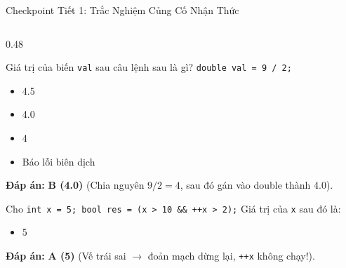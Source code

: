 \documentclass[aspectratio=169, 10pt]{beamer}
\begin{document}
\begin{frame}[fragile]{Checkpoint Tiết 1: Trắc Nghiệm Củng Cố Nhận Thức}
  \begin{columns}[T]
    \begin{column}{0.48\textwidth}
      \begin{tcolorbox}[colback=UniNavy!5,colframe=UniNavy,title=\textbf{Câu hỏi 1: Phép chia nguyên},fonttitle=\small\bfseries]
        Giá trị của biến \texttt{val} sau câu lệnh sau là gì?
        \texttt{double val = 9 / 2;}
        \begin{itemize}\footnotesize
          \item[A.] 4.5
          \item[B.] 4.0
          \item[C.] 4
          \item[D.] Báo lỗi biên dịch
        \end{itemize}
        \textbf{Đáp án:} \textcolor{UniGreen}{\textbf{B (4.0)}} (Chia nguyên $9/2=4$, sau đó gán vào double thành 4.0).
      \end{tcolorbox}

      \begin{tcolorbox}[colback=UniNavy!5,colframe=UniNavy,title=\textbf{Câu hỏi 2: Đoản mạch},fonttitle=\small\bfseries]
        Cho \texttt{int x = 5; bool res = (x > 10 \&\& ++x > 2);} Giá trị của \texttt{x} sau đó là:
        \begin{itemize}\footnotesize
          \item[A.] 5  
        \end{itemize}
        \textbf{Đáp án:} \textcolor{UniGreen}{\textbf{A (5)}} (Vế trái sai $\to$ đoản mạch dừng lại, \texttt{++x} không chạy!).
      \end{tcolorbox}
    \end{column}


\end{columns}
\end{frame}
\end{document}
